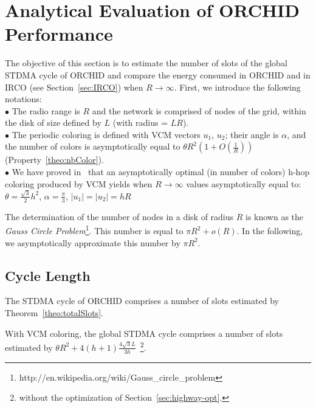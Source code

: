 \section{Analytical Evaluation of ORCHID Performance} \label{sec:results}
The objective of this section is to estimate the number of slots of the global STDMA cycle of ORCHID and compare the  energy consumed in ORCHID and in IRCO 
(see Section~\ref{sec:IRCO}) when $R \rightarrow \infty$.
First, we introduce the following notations: \\
$\bullet$ The radio range is $R$ and the network is comprised of nodes of the grid, within the disk of size defined by $L$ (with radius = $L R$). \\
$\bullet$ The periodic coloring is defined with VCM vectors $u_1$, $u_2$; their angle
  is $\alpha$, and the number of colors is asymptotically equal to $\theta R^2(1+O(\frac{1}{R}))$ (Property~\ref{theo:nbColor}). \\
$\bullet$ We have proved in~\cite{VCM} that an asymptotically optimal (in number of colors) h-hop coloring produced by VCM yields 
  when  $R \rightarrow \infty$ values asymptotically equal to: 
  $\theta = \frac{\sqrt{3}}{2}h^2$, 
  $\alpha=\frac{\pi}{3}$, $|u_1| = |u_2| = hR$


The determination of the number of nodes in a disk of radius $R$ is known as the \textit{Gauss Circle Problem}\footnote{http://en.wikipedia.org/wiki/Gauss\_circle\_problem}. This number is equal to $\pi R^2
+o(R)$. In the following, we asymptotically approximate this number by $\pi R^2$.
\subsection{Cycle Length}\label{sec:analysis}
The STDMA cycle of ORCHID comprises a number of slots estimated by Theorem~\ref{theo:totalSlots}. 
\begin{theorem}\label{theo:totalSlots}
With VCM coloring, the global STDMA cycle comprises a number of slots estimated by $\theta R^2 + 4(h+1)\frac{4\sqrt{3}L}{3h}$~\footnote{without the optimization of Section~\ref{sec:highway-opt}.}.
\end{theorem}

